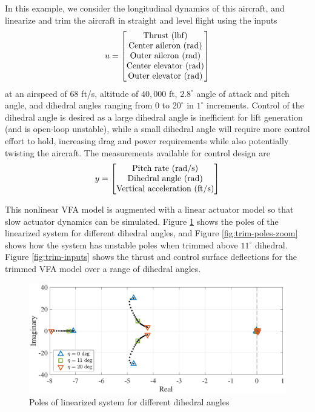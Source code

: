 \documentclass[english]{ifacconf}
\begin{document}
In this example, we consider the longitudinal dynamics of this aircraft, and linearize and trim the aircraft in straight and level flight using the inputs
\begin{equation}
	u = \begin{bmatrix}
		$Thrust (lbf)$\\
		$Center aileron (rad)$\\
		$Outer aileron (rad)$\\
		$Center elevator (rad)$\\
		$Outer elevator (rad)$
	\end{bmatrix}
\end{equation}
at an airspeed of $68$ ft/s, altitude of $40,000$ ft, $2.8^\circ$ angle of attack and pitch angle, and dihedral angles ranging from $0$ to $20^\circ$ in $1^\circ$ increments. Control of the dihedral angle is desired as a large dihedral angle is inefficient for lift generation (and is open-loop unstable), while a small dihedral angle will require more control effort to hold, increasing drag and power requirements while also potentially twisting the aircraft. The measurements available for control design are
\begin{equation}
y = \begin{bmatrix}
	$Pitch rate (rad/s)$\\
	$Dihedral angle (rad)$\\
	$Vertical acceleration (ft/s)$
\end{bmatrix}	
\end{equation}

This nonlinear VFA model is augmented with a linear actuator model so that slow actuator dynamics can be simulated. Figure \ref{fig:trim-poles} shows the poles of the linearized system for different dihedral angles, and Figure \ref{fig:trim-poles-zoom} shows how the system has unstable poles when trimmed above $11^\circ$ dihedral. Figure \ref{fig:trim-inputs} shows the thrust and control surface deflections for the trimmed VFA model over a range of dihedral angles.

\begin{figure}[htbp]
	\centering
	\includegraphics[width=0.95\columnwidth]{../fig/trim-poles-2.pdf}
	\caption{Poles of linearized system for different dihedral angles}
	\label{fig:trim-poles}
\end{figure}
\end{document}
